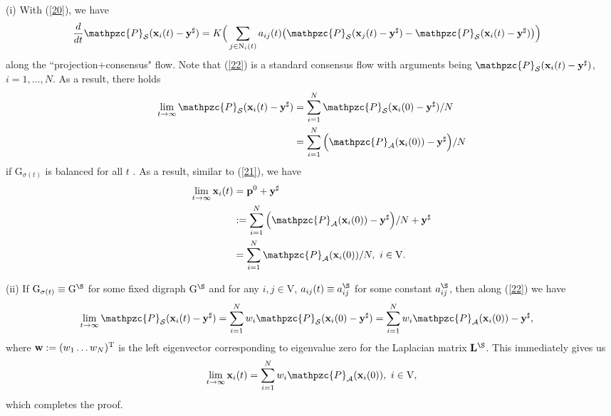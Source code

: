 \documentclass[a4paper, 11pt]{article}
\def\T{^{\rm\tiny T}}
\begin{document}
\noindent (i) With (\ref{20}), we have \begin{align}\label{22}
&\frac{d}{dt} \mathpzc{P}_{\mathcal{S}}(\mathbf{x}_i(t)-\mathbf{y}^\sharp)= K\Big( \sum_{j\in \mathrm{N}_i(t)}a_{ij}(t)\big(\mathpzc{P}_{\mathcal{S}}(\mathbf{x}_j(t)-\mathbf{y}^\sharp)-\mathpzc{P}_{\mathcal{S}}(\mathbf{x}_i(t)-\mathbf{y}^\sharp)\big) \Big)
\end{align}
along the ``projection+consensus" flow. Note that (\ref{22}) is a standard consensus flow with arguments being $\mathpzc{P}_{\mathcal{S}}(\mathbf{x}_i(t)-\mathbf{y}^\sharp)$, $i=1,\dots,N$. As a result, there holds
\begin{align*}
\lim_{t\to\infty}\mathpzc{P}_{\mathcal{S}}(\mathbf{x}_i(t)-\mathbf{y}^\sharp)&= \sum_{i=1}^N \mathpzc{P}_{\mathcal{S}}(\mathbf{x}_i(0)-\mathbf{y}^\sharp)/N\nonumber\\
&=\sum_{i=1}^N \Big(\mathpzc{P}_{\mathcal{A}}(\mathbf{x}_i(0))-\mathbf{y}^\sharp\Big)/N
\end{align*}
if $\mathrm{G}_{\sigma(t)}$ is balanced for all $t$  \cite{saber04}. As a result, similar to  (\ref{21}), we have
\begin{align}
\lim_{t\to\infty} \mathbf{x}_i(t)&=\mathbf{p}^0+\mathbf{y}^\sharp\nonumber\\
&:=\sum_{i=1}^N \Big(\mathpzc{P}_{\mathcal{A}}(\mathbf{x}_i(0))-\mathbf{y}^\sharp\Big)/N+\mathbf{y}^\sharp\nonumber\\
&=\sum_{i=1}^N \mathpzc{P}_{\mathcal{A}}(\mathbf{x}_i(0))/N,\ i\in\mathrm{V}.
\end{align}

\noindent (ii) If $\mathrm{G}_{\sigma(t)}\equiv\mathrm{G}^\S$ for some fixed digraph $\mathrm{G}^\S$ and for any $i,j\in\mathrm{V}$, $a_{ij}(t)\equiv a_{ij}^\S$ for some constant $a_{ij}^\S$, then along (\ref{22}) we have   \cite{saber04}
\begin{align*}
\lim_{t\to\infty}\mathpzc{P}_{\mathcal{S}}(\mathbf{x}_i(t)-\mathbf{y}^\sharp)&= \sum_{i=1}^N w_i\mathpzc{P}_{\mathcal{S}}(\mathbf{x}_i(0)-\mathbf{y}^\sharp)=\sum_{i=1}^N w_i\mathpzc{P}_{\mathcal{A}}(\mathbf{x}_i(0))-\mathbf{y}^\sharp,
\end{align*}
where $\mathbf{w}:=(w_1 \dots w_N)\T$ is the left eigenvector corresponding to eigenvalue zero for the Laplacian matrix $\mathbf{L}^\S$. This immediately gives us
\begin{align}
\lim_{t\to\infty} \mathbf{x}_i(t)=\sum_{i=1}^N w_i\mathpzc{P}_{\mathcal{A}}(\mathbf{x}_i(0)),\ i\in\mathrm{V},
\end{align}
which completes the proof.
\end{document}
